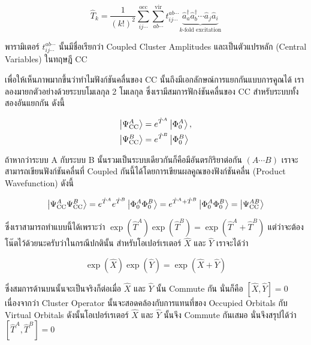 \begin{equation}
    \hat{T}_k
    =
    \frac{1}{(k!)^2} \sum_{ij\cdots}^{\mathrm{occ}} \sum_{ab\cdots}^{\mathrm{vir}} t_{ij\cdots}^{ab\cdots}
    \underbrace{
        \hat{a}_{a}^{\dagger} \hat{a}_{b}^{\dagger} \cdots \hat{a}_{j}^{\,} \hat{a}_{i}^{\,}
    }_{
        k\text{-fold excitation}
    }
\end{equation}

\noindent พารามิเตอร์ $t_{ij\cdots}^{ab\cdots}$ นั้นมีชื่อเรียกว่า Coupled Cluster Amplitudes และเป็นตัวแปรหลัก (Central
Variables) ในทฤษฎี CC

เพื่อให้เห็นภาพมากขึ้นว่าทำไมฟังก์ชันคลื่นของ CC นั้นถึงมีเอกลักษณ์การแยกกันแบบการคูณได้ เราลองมายกตัวอย่างด้วยระบบโมเลกุล 2 โมเลกุล
ซึ่งเรามีสมการฟักง์ชันคลื่นของ CC สำหรับระบบทั้งสองอันแยกกัน ดังนี้

\begin{align}
    \ket{\Psi_{\mathrm{CC}}^A} & = e^{\hat{T}^A} \ket{\Phi_0^A}, \\
    \ket{\Psi_{\mathrm{CC}}^B} & = e^{\hat{T}^B} \ket{\Phi_0^B}
\end{align}

\noindent ถ้าหากว่าระบบ A กับระบบ B นั้นรวมเป็นระบบเดียวกันก็คือมีอันตรกิริยาต่อกัน $(A \cdots B)$ เราจะสามารถเขียนฟังก์ชันคลื่นที่
Coupled กันนี้ได้โดยการเขียนผลคูณของฟังก์ชันคลื่น (Product Wavefunction) ดังนี้

\begin{align}
    \ket{\Psi_{\mathrm{CC}}^A \Psi_{\mathrm{CC}}^B}
    = e^{\hat{T}^A} e^{\hat{T}^B}\ket{\Phi_0^A\Phi_0^B}
    = e^{\hat{T}^A+\hat{T}^B}\ket{\Phi_0^A\Phi_0^B}
    = \ket{\Psi_{\mathrm{CC}}^{AB}}
\end{align}

\noindent ซึ่งเราสามารถทำแบบนี้ได้เพราะว่า $\exp(\hat{T}^A)\exp(\hat{T}^B) = \exp(\hat{T}^A + \hat{T}^B)$
แต่ว่าจะต้องโน๊ตไว้ด้วยนะครับว่าในกรณีปกตินั้น สำหรับโอเปอร์เรเตอร์ $\hat{X}$ และ $\hat{Y}$ เราจะได้ว่า

\begin{equation}
    \exp(\hat{X})\exp(\hat{Y}) = \exp(\hat{X} + \hat{Y})
\end{equation}

\noindent ซึ่งสมการด้านบนนั้นจะเป็นจริงก็ต่อเมื่อ $\hat{X}$ และ $\hat{Y}$ นั้น Commute กัน นั่นก็คือ $[\hat{X}, \hat{Y}] = 0$
เนื่องจากว่า Cluster Operator นั้นจะสอดคล้องกับการแทนที่ของ Occupied Orbitals กับ Virtual Orbitals ดังนั้นโอเปอร์เรเตอร์
$\hat{X}$ และ $\hat{Y}$ นั้นจึง Commute กันเสมอ นั่นจึงสรุปได้ว่า $[\hat{T}^A, \hat{T}^B] = 0$

